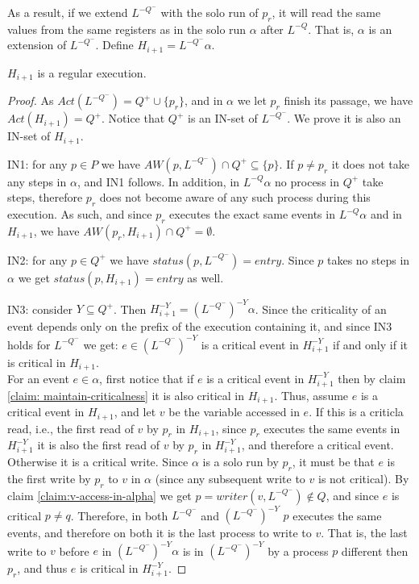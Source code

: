 As a result, if we extend $L^{-Q^-}$ with the solo run of $p_r$, it will read the same values from the same registers as in the solo run $\alpha$ after $L^{-Q}$. That is, $\alpha$ is an extension of $L^{-Q^-}$. Define $H_{i+1} = L^{-Q^-} \alpha$.

\begin{claim-subsection}
	$H_{i+1}$ is a regular execution.
\end{claim-subsection}

\begin{proof}
	
	As $Act(L^{-Q^-}) = Q^+ \cup \{p_r\}$, and in $\alpha$ we let $p_r$ finish its passage, we have $Act(H_{i+1}) = Q^+$. Notice that $Q^+$ is an IN-set of $L^{-Q^-}$. We prove it is also an IN-set of $H_{i+1}$.
	
	IN1: for any $p \in P$ we have $AW(p,L^{-Q^-}) \cap Q^+ \subseteq \{p\}$. If $p \neq p_r$ it does not take any steps in $\alpha$, and IN1 follows. In addition, in $L^{-Q} \alpha$ no process in $Q^+$ take steps, therefore $p_r$ does not become aware of any such process during this execution. As such, and since $p_r$ executes the exact same events in $L^{-Q} \alpha$ and in $H_{i+1}$, we have $AW(p_r, H_{i+1}) \cap Q^+ = \emptyset$.
	
	IN2: for any $p \in Q^+$ we have $status(p,L^{-Q^-}) = entry$. Since $p$ takes no steps in $\alpha$ we get $status(p,H_{i+1}) = entry$ as well.
	
	IN3: consider $Y \subseteq Q^+$. Then $H_{i+1}^{-Y} = (L^{-Q^-})^{-Y} \alpha$. Since the criticality of an event depends only on the prefix of the execution containing it, and since IN3 holds for $L^{-Q^-}$ we get: $e \in (L^{-Q^-})^{-Y}$ is a critical event in $H_{i+1}^{-Y}$ if and only if it is critical in $H_{i+1}$.
	\\ For an event $e \in \alpha$, first notice that if $e$ is a critical event in $H_{i+1}^{-Y}$ then by claim \ref{claim: maintain-criticalness} it is also critical in $H_{i+1}$. Thus, assume $e$ is a critical event in $H_{i+1}$, and let $v$ be the variable accessed in $e$. If this is a criticla read, i.e., the first read of $v$ by $p_r$ in $H_{i+1}$, since $p_r$ executes the same events in $H_{i+1}^{-Y}$ it is also the first read of $v$ by $p_r$ in $H_{i+1}^{-Y}$, and therefore a critical event. Otherwise it is a critical write. Since $\alpha$ is a solo run by $p_r$, it must be that $e$ is the first write by $p_r$ to $v$ in $\alpha$ (since any subsequent write to $v$ is not critical). By claim \ref{claim:v-access-in-alpha} we get $p = writer(v,L^{-Q^-}) \notin Q$, and since $e$ is critical $p \neq q$. Therefore, in both $L^{-Q^-}$ and $(L^{-Q^-})^{-Y}$ $p$ executes the same events, and therefore on both it is the last process to write to $v$. That is, the last write to $v$ before $e$ in $(L^{-Q^-})^{-Y} \alpha$ is in $(L^{-Q^-})^{-Y}$ by a process $p$ different then $p_r$, and thus $e$ is critical in $H_{i+1}^{-Y}$.
	

\end{proof}
